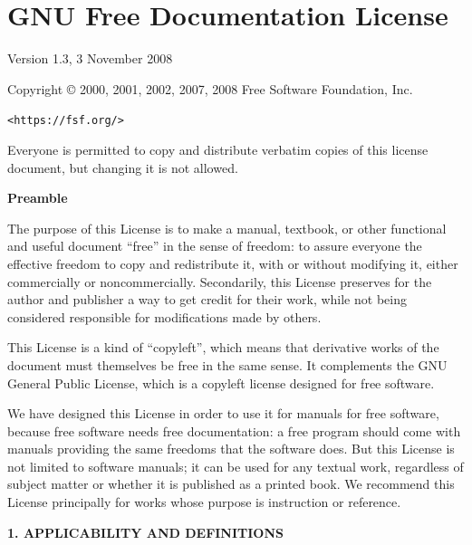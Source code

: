 \documentclass[a4paper,11pt,oneside]{book}
\begin{document}
\chapter{GNU Free Documentation License}

\begin{center}

	Version 1.3, 3 November 2008


	Copyright \copyright{} 2000, 2001, 2002, 2007, 2008  Free Software Foundation, Inc.

	\bigskip

	\texttt{<https://fsf.org/>}

	\bigskip

	Everyone is permitted to copy and distribute verbatim copies
	of this license document, but changing it is not allowed.
\end{center}


\begin{center}
	{\bf\large Preamble}
\end{center}

The purpose of this License is to make a manual, textbook, or other
functional and useful document ``free'' in the sense of freedom: to
assure everyone the effective freedom to copy and redistribute it,
with or without modifying it, either commercially or noncommercially.
Secondarily, this License preserves for the author and publisher a way
to get credit for their work, while not being considered responsible
for modifications made by others.

This License is a kind of ``copyleft'', which means that derivative
works of the document must themselves be free in the same sense.  It
complements the GNU General Public License, which is a copyleft
license designed for free software.

We have designed this License in order to use it for manuals for free
software, because free software needs free documentation: a free
program should come with manuals providing the same freedoms that the
software does.  But this License is not limited to software manuals;
it can be used for any textual work, regardless of subject matter or
whether it is published as a printed book.  We recommend this License
principally for works whose purpose is instruction or reference.


\begin{center}
	{\Large\bf 1. APPLICABILITY AND DEFINITIONS\par}
\end{center}
\end{document}
